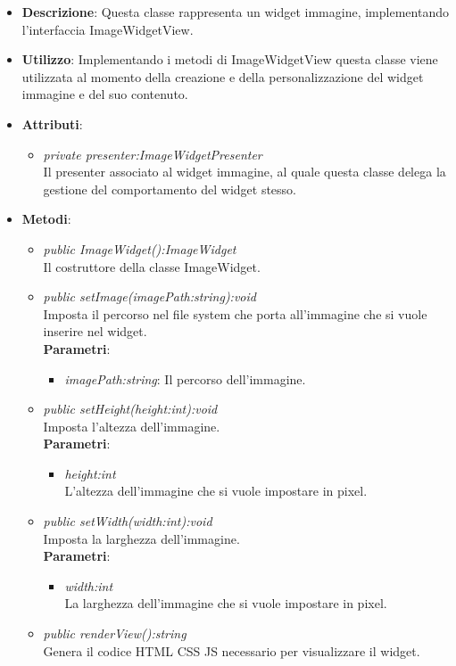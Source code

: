 \begin{itemize}
\item \textbf{Descrizione}: Questa classe rappresenta un widget immagine, implementando l'interfaccia ImageWidgetView.
\item \textbf{Utilizzo}: Implementando i metodi di ImageWidgetView questa classe viene utilizzata al momento della creazione e della personalizzazione del widget immagine e del suo contenuto.
\item \textbf{Attributi}:
	\begin{itemize}
	\item \textit{private presenter:ImageWidgetPresenter}\\
	Il presenter associato al widget immagine, al quale questa classe delega la gestione del comportamento del widget stesso.
	\end{itemize}
\item \textbf{Metodi}:
	\begin{itemize}
	\item \textit{public ImageWidget():ImageWidget}\\
	Il costruttore della classe ImageWidget.
	\item \textit{public setImage(imagePath:string):void}\\
	Imposta il percorso nel file system che porta all'immagine che si vuole inserire nel widget.
		\\ \textbf{Parametri}: \begin{itemize}
		\item \textit{imagePath:string}: Il percorso dell'immagine.
		\end{itemize} 
	\item \textit{public setHeight(height:int):void}\\
	Imposta l'altezza dell'immagine.
		\\ \textbf{Parametri}: \begin{itemize}
		\item \textit{height:int}\\
		L'altezza dell'immagine che si vuole impostare in pixel.
		\end{itemize} 
	\item \textit{public setWidth(width:int):void}\\
	Imposta la larghezza dell'immagine.
		\\ \textbf{Parametri}: \begin{itemize}
		\item \textit{width:int}\\
		La larghezza dell'immagine che si vuole impostare in pixel.
		\end{itemize} 
	\item \textit{public renderView():string}\\
	Genera il codice HTML CSS JS necessario per visualizzare il widget.
	\end{itemize}
\end{itemize}


